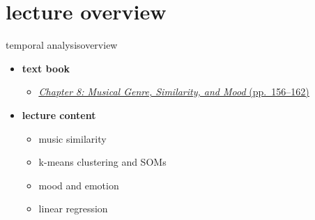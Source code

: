 

\subtitle{Part 9.2: Music Similarity and Mood Recognition}


	

    \section[overview]{lecture overview}
        \begin{frame}{temporal analysis}{overview}
            \begin{itemize}
                \item   \textbf{text book}  
                    \begin{itemize}
                        \item   \href{http://ieeexplore.ieee.org/xpl/articleDetails.jsp?tp=&arnumber=6331125&}{\underline{\textit{Chapter 8: Musical Genre, Similarity, and Mood} (pp.~156--162)}}
                    \end{itemize}
                \bigskip
                \item<2->   \textbf{lecture content}
                    \begin{itemize}
                        \item<2->  music similarity 
                        \item<3->  k-means clustering and SOMs 
                        \item<4->  mood and emotion
                        \item<5->  linear regression
                    \end{itemize}
            \end{itemize}
        \end{frame}

